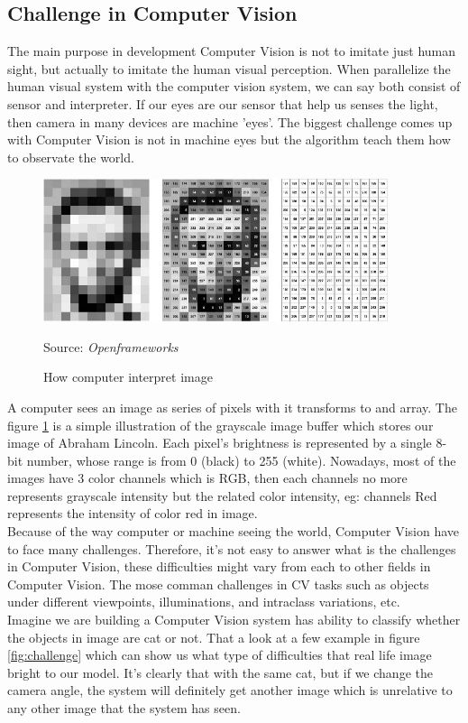\documentclass[12pt]{article}
\newcommand{\source}[1]{\caption*{Source: \emph{#1}} }
\begin{document}
\subsection{Challenge in Computer Vision}
\label{sec:challenges}
The main purpose in development Computer Vision is not to imitate just human sight, but actually
to imitate the human visual perception. When parallelize the human visual system with 
the computer vision system, we can say both consist of sensor and interpreter. If our eyes
are our sensor that help us senses the light, then camera in many devices are machine 'eyes'.
The biggest challenge comes up with Computer Vision is not in machine eyes but the algorithm
teach them how to observate the world. 

\begin{figure}[htp]
    \centering
    \includegraphics[width=0.9\textwidth]{images/how-computer-interpret-image.jpg}
    \caption{How computer interpret image}
    \label{fig:computer_image}
    \source{Openframeworks}
\end{figure}

A computer sees an image as series of pixels with it transforms to and array. 
The figure \ref{fig:computer_image} is a simple illustration of the grayscale image 
buffer which stores our image of Abraham Lincoln. 
Each pixel’s brightness is represented by a single 8-bit number, 
whose range is from 0 (black) to 255 (white). Nowadays, most of the images have 3
color channels which is RGB, then each channels no more represents grayscale intensity
but the related color intensity, eg: channels Red represents the intensity of color red 
in image. \\
Because of the way computer or machine seeing the world, Computer Vision have to face 
many challenges. Therefore, it's not easy to answer what is the challenges in Computer 
Vision, these difficulties might vary from each to other fields in Computer Vision. 
The mose comman challenges in CV tasks such as objects under different viewpoints, 
illuminations, and intraclass variations, etc. \\
Imagine we are building a Computer Vision system has ability to classify whether 
the objects in image are cat or not. That a look at a few example in figure \ref{fig:challenge} 
which can show us what type of difficulties that real life image 
bright to our model.
It's clearly that with the same cat, but if we change the camera angle, 
the system will definitely get another image which is unrelative to any other 
image that the system has seen.
\end{document}
